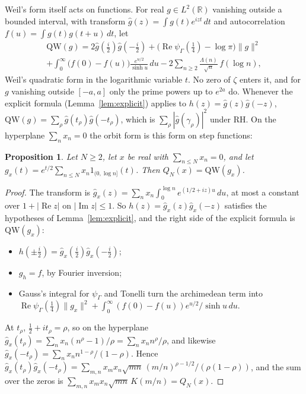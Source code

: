 \documentclass[11pt]{article}
\newtheorem{proposition}[theorem]{Proposition}
\theoremstyle{definition}
\newcommand{\KH}{K}
\begin{document}
Weil's form itself acts on functions. For real $g \in L^2(\mathbb R)$ vanishing outside a bounded interval, with
transform $\hat g(z) = \int g(t) e^{izt}\,dt$ and autocorrelation $f(u) = \int g(t) g(t + u)\,dt$, let
\begin{multline*}
\mathrm{QW}(g) = 2\hat g(\tfrac i2)\hat g(-\tfrac i2) + \big(\operatorname{Re}\psi_\Gamma(\tfrac14) - \log\pi\big)
\|g\|^2 \\
+ \int_0^\infty \big(f(0) - f(u)\big)\frac{e^{u/2}}{\sinh u}\,du - 2\sum_{n \ge 2} \frac{\Lambda(n)}{\sqrt n}\, f(\log
n),
\end{multline*}
Weil's quadratic form in the logarithmic variable $t$. No zero of $\zeta$ enters it, and for $g$ vanishing outside $[-a,
a]$ only the prime powers up to $e^{2a}$ do. Whenever the explicit formula (Lemma~\ref{lem:explicit}) applies to
$h(z) = \hat g(z)\hat g(-z)$, $\mathrm{QW}(g) = \sum_\rho \hat g(t_\rho)\hat g(-t_\rho)$, which is $\sum_\rho |\hat
g(\gamma_\rho)|^2$ under RH. On the hyperplane $\sum_n x_n = 0$ the orbit form is this form on step functions:

\begin{proposition}\label{prop:window}
Let $N \ge 2$, let $x$ be real with $\sum_{n \le N} x_n = 0$, and let $g_x(t) = e^{t/2} \sum_{n \le N} x_n 1_{(0, \log
n]}(t)$. Then $Q_N(x) = \mathrm{QW}(g_x)$.
\end{proposition}

\begin{proof}
The transform is $\hat g_x(z) = \sum_n x_n \int_0^{\log n} e^{(1/2 + iz)u}\,du$, at most a constant over $1 +
|\operatorname{Re} z|$ on $|\operatorname{Im} z| \le 1$. So $h(z) = \hat g_x(z)\hat g_x(-z)$ satisfies the hypotheses
of Lemma~\ref{lem:explicit}, and the right side of the explicit formula is $\mathrm{QW}(g_x)$:
\begin{itemize}
\item $h(\pm\frac i2) = \hat g_x(\frac i2)\hat g_x(-\frac i2)$;
\item $g_h = f$, by Fourier inversion;
\item Gauss's integral for $\psi_\Gamma$ \cite[(5.9.12)]{dlmf} and Tonelli turn the archimedean term into
$\operatorname{Re}
\psi_\Gamma(\frac14)\|g_x\|^2 + \int_0^\infty (f(0) - f(u))e^{u/2}/\sinh u\,du$.
\end{itemize}
At $t_\rho$, $\frac12 + it_\rho = \rho$, so on the hyperplane $\hat g_x(t_\rho) = \sum_n x_n (n^\rho - 1)/\rho = \sum_n
x_n n^\rho/\rho$, and likewise $\hat g_x(-t_\rho) = \sum_n x_n n^{1 - \rho}/(1 - \rho)$. Hence $\hat g_x(t_\rho)\hat
g_x(-t_\rho) = \sum_{m, n} x_m x_n \sqrt{mn}\,(m/n)^{\rho - 1/2}/(\rho(1 - \rho))$, and the sum over the zeros is
$\sum_{m, n} x_m x_n \sqrt{mn}\,\KH(m/n) = Q_N(x)$.
\end{proof}
\end{document}
